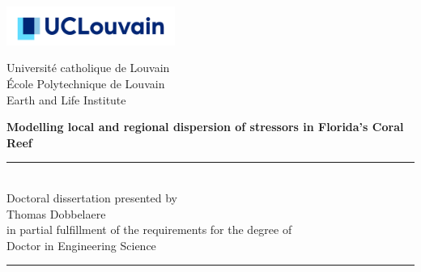 \thispagestyle{empty}
\begin{minipage}[b]{0.3\textwidth}
\hspace*{-0.8cm}\includegraphics[width=5.5cm]{./figures/logo_ucl.jpg}\vspace{0.35cm}
\end{minipage}
\begin{minipage}[b]{0.69\textwidth}
	\begin{center}
	\hspace*{0.5cm}Université catholique de Louvain\\
	\hspace*{0.5cm}\'Ecole Polytechnique de Louvain\\
	\hspace*{0.5cm} Earth and Life Institute\\
	\end{center}
\end{minipage}


\vspace*{3cm}
\hspace{-0.8cm}
\begin{minipage}{1.02\linewidth}
\centering
\LARGE\bfseries Modelling local and regional dispersion of stressors in Florida's Coral Reef
\end{minipage}


\vspace*{0.5cm}
\hspace{-0.5cm}\begin{minipage}{\textwidth}
\centering
\rule{50pt}{.5pt}\\[1.2ex]
Doctoral dissertation presented by \\ [2.ex]
{\Large Thomas Dobbelaere\\ [2.ex]
}
in partial fulfillment of the requirements for the degree of\\ [2.ex]
\Large Doctor in Engineering Science

\rule{50pt}{.5pt}\\
\end{minipage}

